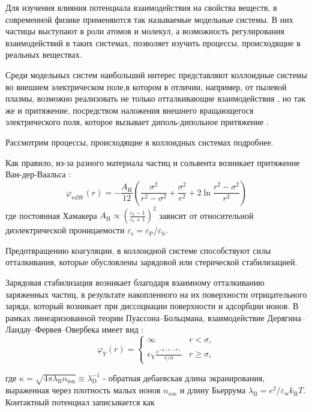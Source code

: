 Для изучения влияния потенциала взаимодействия на свойства веществ, в современной физике применяются так называемые модельные системы. В них частицы выступают в роли атомов и молекул, а возможность регулирования взаимодействий в таких системах, позволяет изучить процессы, происходящие в реальных веществах.

Среди модельных систем наибольший интерес представляют коллоидные системы во внешнем электрическом поле,в котором в отличии, например, от пылевой плазмы, возможно реализовать не только отталкивающие взаимодействия \cite{gel3}, но так же и притяжение, посредством наложения внешнего вращающегося электрического поля, которое вызывает диполь-дипольное притяжение \cite{gel6}.

Рассмотрим процессы, происходящие в коллоидных системах подробнее. 

Как правило, из-за разного материала частиц и сольвента возникает притяжение Ван-дер-Ваальса \cite{Yur31, Yur53}:
\begin{equation}
\varphi_{\mathrm{vdW}}(r)=-\frac{A_{\mathrm{H}}}{12}\left(\frac{\sigma^{2}}{r^{2}-\sigma^{2}}+\frac{\sigma^{2}}{r^{2}}+2 \ln \frac{r^{2}-\sigma^{2}}{r^{2}}\right)
\end{equation}
где постоянная Хамакера $A_{\mathrm{H}} \propto\left(\frac{\varepsilon_{\mathrm{r}}-1}{\varepsilon_{\mathrm{r}}+1}\right)^{2}$ зависит от относительной диэлектрической проницаемости $\varepsilon_{\mathrm{r}}=\varepsilon_{\mathrm{P}} / \varepsilon_{\mathrm{S}}$. 

Предотвращению коагуляции, в коллоидной системе способствуют силы отталкивания, которые обусловлены зарядовой или стерической стабилизацией.

Зарядовая стабилизация возникает благодаря взаимному отталкиванию заряженных частиц, в результате накопленного на их поверхности отрицательного заряда, который возникает при диссоциации поверхности и адсорбции ионов. 
В рамках линеаризованной теории Пуассона--Больцмана, взаимодействие Дерягина--Ландау--Фервея--Овербека имеет вид \cite{Yur54}:
\begin{equation}
\varphi_{Y}(r)=\left\{\begin{array}{ll}
\infty & r<\sigma, \\
\epsilon_{\mathrm{Y}} \frac{e^{-\kappa(r-\sigma)}}{r / \sigma} & r \geq \sigma,
\end{array}\right.
\end{equation}

где $\kappa=\sqrt{4 \pi \lambda_{\mathrm{B}} n_{\mathrm{ion}}} \equiv \lambda_{\mathrm{D}}^{-1}$ - обратная дебаевская длина экранирования, выраженная через плотность малых ионов $n_{ion}$ и длину Бьеррума $\lambda_{\mathrm{B}}=e^{2} / \varepsilon_{\mathrm{w}} k_{\mathrm{B}} T$. Контактный потенциал записывается как 

